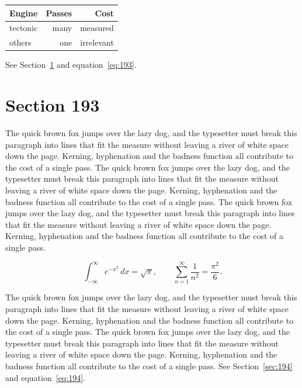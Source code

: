 \documentclass{article}
\begin{document}
\begin{center}
\begin{tabular}{lrr}
\toprule
Engine & Passes & Cost \\
\midrule
tectonic & many & measured \\
others & one & irrelevant \\
\bottomrule
\end{tabular}
\end{center}

See Section~\ref{sec:193} and equation~\eqref{eq:193}.
\section{Section 193}
\label{sec:193}
The quick brown fox jumps over the lazy dog, and the typesetter must break this paragraph into lines that fit the measure without leaving a river of white space down the page. Kerning, hyphenation and the badness function all contribute to the cost of a single pass. The quick brown fox jumps over the lazy dog, and the typesetter must break this paragraph into lines that fit the measure without leaving a river of white space down the page. Kerning, hyphenation and the badness function all contribute to the cost of a single pass. The quick brown fox jumps over the lazy dog, and the typesetter must break this paragraph into lines that fit the measure without leaving a river of white space down the page. Kerning, hyphenation and the badness function all contribute to the cost of a single pass. 

\begin{equation}\label{eq:193}
\int_{-\infty}^{\infty} e^{-x^{2}}\,dx = \sqrt{\pi}, \qquad
\sum_{n=1}^{\infty} \frac{1}{n^{2}} = \frac{\pi^{2}}{6}.
\end{equation}

The quick brown fox jumps over the lazy dog, and the typesetter must break this paragraph into lines that fit the measure without leaving a river of white space down the page. Kerning, hyphenation and the badness function all contribute to the cost of a single pass. The quick brown fox jumps over the lazy dog, and the typesetter must break this paragraph into lines that fit the measure without leaving a river of white space down the page. Kerning, hyphenation and the badness function all contribute to the cost of a single pass. 
See Section~\ref{sec:194} and equation~\eqref{eq:194}.
\end{document}
